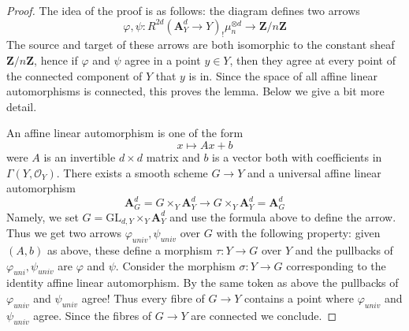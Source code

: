 \begin{proof}
The idea of the proof is as follows: the diagram defines two
arrows
$$
\varphi, \psi :
R^{2d}(\mathbf{A}^d_Y \to Y)_!\mu_n^{\otimes d}
\longrightarrow
\mathbf{Z}/n\mathbf{Z}
$$
The source and target of these arrows are both isomorphic to the
constant sheaf $\mathbf{Z}/n\mathbf{Z}$, hence if $\varphi$ and $\psi$ agree
in a point $y \in Y$, then they agree at every point of the connected
component of $Y$ that $y$ is in. Since the space of all affine
linear automorphisms is connected, this proves the lemma. Below
we give a bit more detail.

\medskip\noindent
An affine linear automorphism is one of the form
$$
x \longmapsto Ax + b
$$
were $A$ is an invertible $d \times d$ matrix and $b$ is a vector
both with coefficients in $\Gamma(Y, \mathcal{O}_Y)$. There exists
a smooth scheme $G \to Y$ and a universal affine linear automorphism
$$
\mathbf{A}^d_G = G \times_Y \mathbf{A}^d_Y
\longrightarrow
G \times_Y \mathbf{A}^d_Y = \mathbf{A}^d_G
$$
Namely, we set $G = \text{GL}_{d, Y} \times_Y \mathbf{A}^d_Y$
and use the formula above to define the arrow. Thus we get two
arrows $\varphi_{univ}, \psi_{univ}$ over $G$ with the following
property: given $(A, b)$ as above, these define a morphism
$\tau : Y \to G$ over $Y$ and the pullbacks of $\varphi_{uni}, \psi_{univ}$ 
are $\varphi$ and $\psi$. Consider the morphism
$\sigma : Y \to G$ corresponding to the identity
affine linear automorphism. By the same token as above the pullbacks of
$\varphi_{univ}$ and $\psi_{univ}$ agree! Thus every fibre of $G \to Y$
contains a point where $\varphi_{univ}$ and $\psi_{univ}$ agree.
Since the fibres of $G \to Y$ are connected we conclude.
\end{proof}

